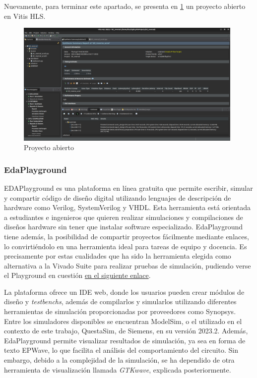 Nuevamente, para terminar este apartado, se presenta en \ref{fig:proyectoHLS} un proyecto abierto en Vitis HLS.

\begin{figure}[!ht]
  \centering
  \includegraphics[width=11cm]{figures/proyectoHLS.png}
  \caption{Proyecto abierto}
  \label{fig:proyectoHLS}
\end{figure}

\subsubsection{EdaPlayground}
\label{st:edaplayground}
EDAPlayground es una plataforma en línea gratuita que permite escribir, simular y compartir código de diseño digital utilizando lenguajes de descripción de hardware como Verilog, SystemVerilog y VHDL. Esta herramienta está orientada a estudiantes e ingenieros que quieren realizar simulaciones y compilaciones de diseños hardware sin tener que instalar software especializado. EdaPlayground tiene además, la posibilidad de compartir proyectos fácilmente mediante enlaces, lo convirtiéndolo en una herramienta ideal para tareas de equipo y docencia. Es precisamente por estas cualidades que ha sido la herramienta elegida como alternativa a la Vivado Suite para realizar pruebas de simulación, pudiendo verse el Playground en cuestión \href{https://edaplayground.com/x/tmnc}{en el siguiente enlace}.

La plataforma ofrece un \ac{IDE} web, donde los usuarios pueden crear módulos de diseño y \textit{testbenchs}, además de compilarlos y simularlos utilizando diferentes herramientas de simulación proporcionadas por proveedores como Synopsys. Entre los simuladores disponibles se encuentran ModelSim, o el utilizado en el contexto de este trabajo, QuestaSim, de Siemens, en su versión 2023.2. Además, EdaPlayground permite visualizar resultados de simulación, ya sea en forma de texto EPWave, lo que facilita el análisis del comportamiento del circuito. Sin embargo, debido a la complejidad de la simulación, se ha dependido de otra herramienta de visualización llamada \emph{GTKwave}, explicada posteriormente.

